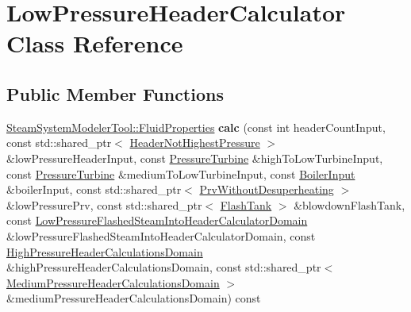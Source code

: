 \hypertarget{class_low_pressure_header_calculator}{}\section{Low\+Pressure\+Header\+Calculator Class Reference}
\label{class_low_pressure_header_calculator}
\subsection*{Public Member Functions}
\begin{DoxyCompactItemize}
\item 
\mbox{\label{class_low_pressure_header_calculator_a7fb9b679355ee5dceee19f2d78a2e6d2}} 
\hyperlink{struct_steam_system_modeler_tool_1_1_fluid_properties}{Steam\+System\+Modeler\+Tool\+::\+Fluid\+Properties} {\bfseries calc} (const int header\+Count\+Input, const std\+::shared\+\_\+ptr$<$ \hyperlink{class_header_not_highest_pressure}{Header\+Not\+Highest\+Pressure} $>$ \&low\+Pressure\+Header\+Input, const \hyperlink{class_pressure_turbine}{Pressure\+Turbine} \&high\+To\+Low\+Turbine\+Input, const \hyperlink{class_pressure_turbine}{Pressure\+Turbine} \&medium\+To\+Low\+Turbine\+Input, const \hyperlink{class_boiler_input}{Boiler\+Input} \&boiler\+Input, const std\+::shared\+\_\+ptr$<$ \hyperlink{class_prv_without_desuperheating}{Prv\+Without\+Desuperheating} $>$ \&low\+Pressure\+Prv, const std\+::shared\+\_\+ptr$<$ \hyperlink{class_flash_tank}{Flash\+Tank} $>$ \&blowdown\+Flash\+Tank, const \hyperlink{class_low_pressure_flashed_steam_into_header_calculator_domain}{Low\+Pressure\+Flashed\+Steam\+Into\+Header\+Calculator\+Domain} \&low\+Pressure\+Flashed\+Steam\+Into\+Header\+Calculator\+Domain, const \hyperlink{class_high_pressure_header_calculations_domain}{High\+Pressure\+Header\+Calculations\+Domain} \&high\+Pressure\+Header\+Calculations\+Domain, const std\+::shared\+\_\+ptr$<$ \hyperlink{class_medium_pressure_header_calculations_domain}{Medium\+Pressure\+Header\+Calculations\+Domain} $>$ \&medium\+Pressure\+Header\+Calculations\+Domain) const
\item 
\mbox{\label{class_low_pressure_header_calculator_a7fb9b679355ee5dceee19f2d78a2e6d2}} 

\end{DoxyCompactItemize}
